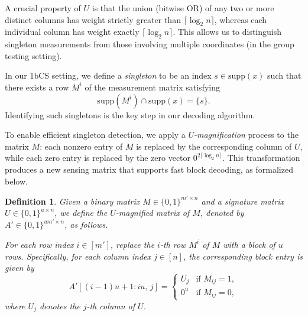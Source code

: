 \documentclass{article}
\newtheorem{definition}{Definition}[subsection]
\newcommand{\supp}{\mathrm{supp}}
\begin{document}
A crucial property of $U$ is that the union (bitwise OR) of any two or more distinct columns has weight strictly greater than $\lceil \log_2 n \rceil$, whereas each individual column has weight exactly $\lceil \log_2 n \rceil$. This allows us to distinguish singleton measurements from those involving multiple coordinates (in the group testing setting).

In our 1bCS setting, we define a \emph{singleton} to be an index $s \in \supp(x)$ such that there exists a row $M^i$ of the measurement matrix satisfying
\[
\supp(M^i) \cap \supp(x) = \{s\}.
\]
Identifying such singletons is the key step in our decoding algorithm.

To enable efficient singleton detection, we apply a \emph{$U$-magnification} process to the matrix $M$: each nonzero entry of $M$ is replaced by the corresponding column of $U$, while each zero entry is replaced by the zero vector $0^{2\lceil \log_2 n \rceil}$. This transformation produces a new sensing matrix that supports fast block decoding, as formalized below.

\begin{definition}\label{def:umm}
    Given a binary matrix $M \in \{0,1\}^{m' \times n}$ and a signature matrix $U \in \{0,1\}^{u \times n}$, we define the \emph{$U$-magnified matrix} of $M$, denoted by $A' \in \{0,1\}^{um' \times n}$, as follows.

For each row index $i \in [m']$, replace the $i$-th row $M^i$ of $M$ with a block of $u$ rows. Specifically, for each column index $j \in [n]$, the corresponding block entry is given by
\[
A'[(i-1)u + 1 : iu,\, j] =
\begin{cases}
U_j & \text{if } M_{ij} = 1,\\
0^u & \text{if } M_{ij} = 0,
\end{cases}
\]
where $U_j$ denotes the $j$-th column of $U$.
\end{definition}
\end{document}
